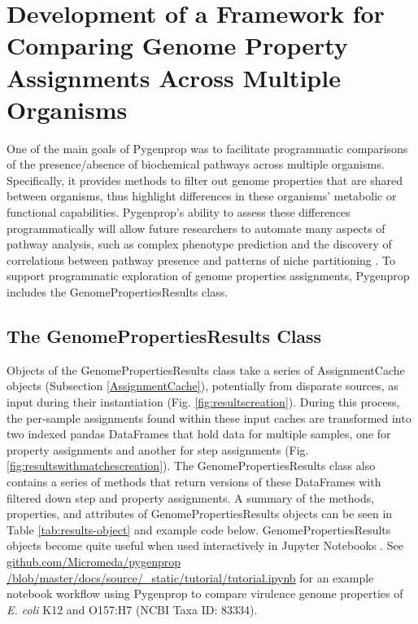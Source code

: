 \section{Development of a Framework for Comparing Genome Property Assignments Across Multiple Organisms} \label{GenomePropertiesResults}

One of the main goals of Pygenprop was to facilitate programmatic comparisons of the presence/absence of biochemical pathways across multiple organisms. Specifically, it provides methods to filter out genome properties that are shared between organisms, thus highlight differences in these organisms' metabolic or functional capabilities. Pygenprop's ability to assess these differences programmatically will allow future researchers to automate many aspects of pathway analysis, such as complex phenotype prediction and the discovery of correlations between pathway presence and patterns of niche partitioning \cite{finke2008niche}. To support programmatic exploration of genome properties assignments, Pygenprop includes the GenomePropertiesResults class. 

\subsection{The GenomePropertiesResults Class}

Objects of the GenomePropertiesResults class take a series of AssignmentCache objects (Subsection \ref{AssignmentCache}), potentially from disparate sources, as input during their instantiation (Fig. \ref{fig:resultscreation}). During this process, the per-sample assignments found within these input caches are transformed into two indexed pandas DataFrames \cite{mckinney2010data} that hold data for multiple samples, one for property assignments and another for step assignments (Fig. \ref{fig:resultswithmatchescreation}). The GenomePropertiesResults class also contains a series of methods that return versions of these DataFrames with filtered down step and property assignments. A summary of the methods, properties, and attributes of GenomePropertiesResults objects can be seen in Table \ref{tab:results-object} and example code below. GenomePropertiesResults objects become quite useful when used interactively in Jupyter Notebooks \cite{kluyver2016jupyter}. See \href{github.com/Micromeda/pygenprop/blob/master/docs/source/\_static/tutorial/tutorial.ipynb}{github.com/Micromeda/pygenprop /blob/master/docs/source/\_static/tutorial/tutorial.ipynb} for an example notebook workflow using Pygenprop to compare virulence genome properties of \textit{E. coli} K12 and O157:H7 (NCBI Taxa ID: 83334).

